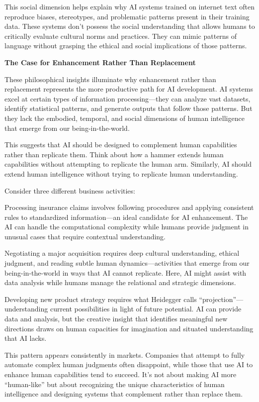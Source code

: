 \documentclass[
  Letterpaper,
]{scrbook}
\begin{document}
This social dimension helps explain why AI systems trained on internet
text often reproduce biases, stereotypes, and problematic patterns
present in their training data. These systems don't possess the social
understanding that allows humans to critically evaluate cultural norms
and practices. They can mimic patterns of language without grasping the
ethical and social implications of those patterns.

\textbf{The Case for Enhancement Rather Than Replacement}

These philosophical insights illuminate why enhancement rather than
replacement represents the more productive path for AI development. AI
systems excel at certain types of information processing---they can
analyze vast datasets, identify statistical patterns, and generate
outputs that follow those patterns. But they lack the embodied,
temporal, and social dimensions of human intelligence that emerge from
our being-in-the-world.

This suggests that AI should be designed to complement human
capabilities rather than replicate them. Think about how a hammer
extends human capabilities without attempting to replicate the human
arm. Similarly, AI should extend human intelligence without trying to
replicate human understanding.

Consider three different business activities:

Processing insurance claims involves following procedures and applying
consistent rules to standardized information---an ideal candidate for AI
enhancement. The AI can handle the computational complexity while humans
provide judgment in unusual cases that require contextual understanding.

Negotiating a major acquisition requires deep cultural understanding,
ethical judgment, and reading subtle human dynamics---activities that
emerge from our being-in-the-world in ways that AI cannot replicate.
Here, AI might assist with data analysis while humans manage the
relational and strategic dimensions.

Developing new product strategy requires what Heidegger calls
``projection''---understanding current possibilities in light of future
potential. AI can provide data and analysis, but the creative insight
that identifies meaningful new directions draws on human capacities for
imagination and situated understanding that AI lacks.

This pattern appears consistently in markets. Companies that attempt to
fully automate complex human judgments often disappoint, while those
that use AI to enhance human capabilities tend to succeed. It's not
about making AI more ``human-like'' but about recognizing the unique
characteristics of human intelligence and designing systems that
complement rather than replace them.
\end{document}
